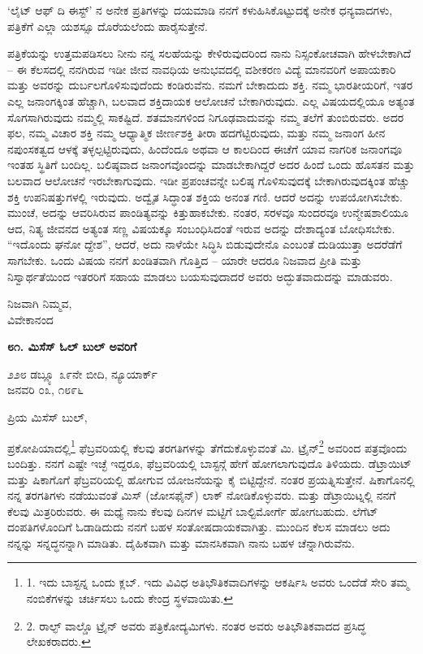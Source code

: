 ‘ಲೈಟ್ ಆಫ್ ದಿ ಈಸ್ಟ್’ ನ ಅನೇಕ ಪ್ರತಿಗಳನ್ನು ದಯಮಾಡಿ ನನಗೆ ಕಳುಹಿಸಿಕೊಟ್ಟುದಕ್ಕೆ ಅನೇಕ ಧನ್ಯವಾದಗಳು, ಪತ್ರಿಕೆಗೆ ಎಲ್ಲಾ ಯಶಸ್ಸೂ ದೊರೆಯಲೆಂದು ಹಾರೈಸುತ್ತೇನೆ.

ಪತ್ರಿಕೆಯನ್ನು ಉತ್ತಮಪಡಿಸಲು ನೀನು ನನ್ನ ಸಲಹೆಯನ್ನು ಕೇಳಿರುವುದರಿಂದ ನಾನು ನಿಸ್ಸಂಕೋಚವಾಗಿ ಹೇಳಬೇಕಾಗಿದೆ – ಈ ಕೆಲಸದಲ್ಲಿ ನನಗಿರುವ ಇಡೀ ಜೀವ ನಾವಧಿಯ ಅನುಭವದಲ್ಲಿ ವಶೀಕರಣ ವಿದ್ಯೆ ಮಾನವರಿಗೆ ಅಪಾಯಕಾರಿ ಮತ್ತು ಅವರನ್ನು ದುರ್ಬಲಗೊಳಿಸುವುದೆಂದು ಕಂಡಿರುವೆನು. ನಮಗೆ ಬೇಕಾದುದು ಶಕ್ತಿ. ನಮ್ಮ ಭಾರತೀಯರಿಗೆ, ಇತರ ಎಲ್ಲ ಜನಾಂಗಕ್ಕಿಂತ ಹೆಚ್ಚಾಗಿ, ಬಲವಾದ ಶಕ್ತಿದಾಯಕ ಆಲೋಚನೆ ಬೇಕಾಗಿರುವುದು. ಎಲ್ಲ ವಿಷಯದಲ್ಲಿಯೂ ಅತ್ಯಂತ ಸೊಗಸಾಗಿರುವುದು ನಮ್ಮಲ್ಲಿ ಸಾಕಷ್ಟಿದೆ. ಶತಮಾನಗಳಿಂದ ನಿಗೂಢವಾದುವನ್ನು ನಮ್ಮ ತಲೆಗೆ ತುಂಬಿರುವರು. ಅದರ ಫಲ, ನಮ್ಮ ವಿಚಾರ ಶಕ್ತಿ ನಮ್ಮ ಆಧ್ಯಾತ್ಮಿಕ ಜೀರ್ಣಶಕ್ತಿ ತೀರಾ ಹದಗೆಟ್ಟಿರುವುದು, ಮತ್ತು ನಮ್ಮ ಜನಾಂಗ ಹೀನ ನಪುಂಸಕತ್ವದ ಆಳಕ್ಕೆ ತಳ್ಳಲ್ಪಟ್ಟಿರುವುದು, ಹಿಂದೆಂದೂ ಅಥವಾ ಆ ಕಾಲದಿಂದ ಈಚೆಗೆ ಯಾವ ನಾಗರಿಕ ಜನಾಂಗವೂ ಇಂತಹ ಸ್ಥಿತಿಗೆ ಬಂದಿಲ್ಲ. ಬಲಿಷ್ಠವಾದ ಜನಾಂಗವೊಂದನ್ನು ಮಾಡಬೇಕಾಗಿದ್ದರೆ ಅದರ ಹಿಂದೆ ಒಂದು ಹೊಸತನ ಮತ್ತು ಬಲವಾದ ಆಲೋಚನೆ ಇರಬೇಕಾಗುವುದು. ಇಡೀ ಪ್ರಪಂಚವನ್ನೇ ಬಲಿಷ್ಠ ಗೊಳಿಸುವುದಕ್ಕೆ ಬೇಕಾಗಿರುವುದಕ್ಕಿಂತ ಹೆಚ್ಚು ಶಕ್ತಿ ಉಪನಿಷತ್ತುಗಳಲ್ಲಿ ಇರುವುದು. ಅದ್ವೈತ ಸಿದ್ಧಾಂತ ಶಕ್ತಿಯ ಅನಂತ ಗಣಿ. ಆದರೆ ಅದನ್ನು ಉಪಯೋಗಿಸಬೇಕು. ಮುಂಚೆ, ಅದನ್ನು ಆವರಿಸಿರುವ ಪಾಂಡಿತ್ಯವನ್ನು ಕಿತ್ತುಹಾಕಬೇಕು. ನಂತರ, ಸರಳವೂ ಸುಂದರವೂ ಉನ್ಮೇಷಶಾಲಿಯೂ ಆದ, ನಿತ್ಯ ಜೀವನದ ಅತ್ಯಂತ ಸಣ್ಣ ವಿಷಯಕ್ಕೂ ಸಂಬಂಧಿಸಿದಂತೆ ಇರುವ ಅದನ್ನು ದೇಶಾದ್ಯಂತ ಬೋಧಿಸಬೇಕು. “ಇದೊಂದು ಘನೋ ದ್ದೇಶ”, ಆದರೆ, ಅದು ನಾಳೆಯೇ ಸಿದ್ಧಿಸಿ ಬಿಡುವುದೇನೊ ಎಂಬಂತೆ ದುಡಿಯುತ್ತಾ ಅದರೆಡೆಗೆ ಸಾಗಬೇಕು. ಒಂದು ವಿಷಯ ನನಗೆ ಖಂಡಿತವಾಗಿ ಗೊತ್ತಿದ – ಯಾರೇ ಆದರೂ ನಿಜವಾದ ಪ್ರೀತಿ ಮತ್ತು ನಿಸ್ವಾರ್ಥತೆಯಿಂದ ಇತರರಿಗೆ ಸಹಾಯ ಮಾಡಲು ಬಯಸುವುದಾದರೆ ಅವರು ಅದ್ಭುತವಾದುದನ್ನು ಮಾಡುವರು.

\begin{flushright}
ನಿಜವಾಗಿ ನಿಮ್ಮವ,\\ವಿವೇಕಾನಂದ
\end{flushright}

\begin{center}
\textbf{೮೧. ಮಿಸೆಸ್ ಓಲ್ ಬುಲ್ ಅವರಿಗೆ}
\end{center}

\begin{flushright}
೨೨೮ ಡಬ್ಲ್ಯೂ ೩೯ನೇ ಬೀದಿ, ನ್ಯೂಯಾರ್ಕ್\\ಜನವರಿ ೦೩, ೧೮೯೬
\end{flushright}

ಪ್ರಿಯ ಮಿಸೆಸ್ ಬುಲ್,

ಪ್ರಕೋಪಿಯಾದಲ್ಲಿ\footnote{1. ಇದು ಬಾಸ್ಟನ್ನ ಒಂದು ಕ್ಲಬ್. ಇದು ವಿವಿಧ ಅತಿಭೌತಿಕವಾದಿಗಳನ್ನು ಆಕರ್ಷಿಸಿ ಅವರು ಒಂದೆಡೆ ಸೇರಿ ತಮ್ಮ ನಂಬಿಕೆಗಳನ್ನು ಚರ್ಚಿಸಲು ಒಂದು ಕೇಂದ್ರ ಸ್ಥಳವಾಯಿತು.} ಫೆಬ್ರವರಿಯಲ್ಲಿ ಕೆಲವು ತರಗತಿಗಳನ್ನು ತೆಗೆದುಕೊಳ್ಳುವಂತೆ ಮಿ. ಟ್ರೈನ್\footnote{2. ರಾಲ್ಫ್ ವಾಲ್ಡೊ ಟ್ರೈನ್ ಅವರು ಪತ್ರಿಕೋದ್ಯಮಿಗಳು. ನಂತರ ಅವರು ಅತಿಭೌತಿಕವಾದದ ಪ್ರಸಿದ್ಧ ಲೇಖಕರಾದರು.} ಅವರಿಂದ ಪತ್ರವೊಂದು ಬಂದಿತ್ತು. ನನಗೆ ಎಷ್ಟೇ ಇಚ್ಛೆ ಇದ್ದರೂ, ಫೆಬ್ರವರಿಯಲ್ಲಿ ಬಾಸ್ಟನ್ಗೆ ಹೇಗೆ ಹೋಗಲಾಗುವುದೊ ತಿಳಿಯದು. ಡೆಟ್ರಾಯಿಟ್ ಮತ್ತು ಷಿಕಾಗೊಗೆ ಫೆಬ್ರವರಿಯಲ್ಲಿ ಹೋಗುವ ಯೋಜನೆಯನ್ನು ಕೈ ಬಿಟ್ಟಿದ್ದೇನೆ. ನಂತರ ಪ್ರಯತ್ನಿಸುತ್ತೇನೆ. ಷಿಕಾಗೊನಲ್ಲಿ ನನ್ನ ತರಗತಿಗಳು ನಡೆಯುವಂತೆ ಮಿಸ್ (ಜೋಸಫೈನ್) ಲಾಕ್ ನೋಡಿಕೊಳ್ಳುವರು. ಮತ್ತು ಡೆಟ್ರಾಯಿಟ್ನಲ್ಲಿ ನನಗೆ ಕೆಲವು ಮಿತ್ರರಿರುವರು. ಈ ಮಧ್ಯೆ ನಾನು ಕೆಲವು ದಿನಗಳ ಮಟ್ಟಿಗೆ ಬಾಲ್ಟಿಮೋರ್ಗೆ ಹೋಗಬಹುದು. ಲೆಗೆಟ್ ದಂಪತಿಗಳೊಂದಿಗೆ ಓಡಾಡಿದುದು ನನಗೆ ಬಹಳ ಸಂತೋಷದಾಯಕವಾಗಿತ್ತು. ಮುಂದಿನ ಕೆಲಸ ಮಾಡಲು ಅದು ನನ್ನನ್ನು ಸನ್ನದ್ಧನನ್ನಾಗಿ ಮಾಡಿತು. ದೈಹಿಕವಾಗಿ ಮತ್ತು ಮಾನಸಿಕವಾಗಿ ನಾನು ಬಹಳ ಚೆನ್ನಾಗಿರುವೆನು.

